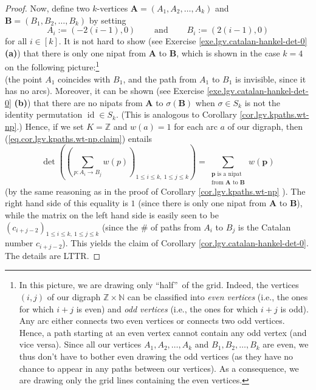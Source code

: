 \begin{proof}
Now, define two $k$-vertices $\mathbf{A}=\left(  A_{1},A_{2},\ldots
,A_{k}\right)  $ and $\mathbf{B}=\left(  B_{1},B_{2},\ldots,B_{k}\right)  $ by
setting%
\[
A_{i}:=\left(  -2\left(  i-1\right)  ,0\right)  \ \ \ \ \ \ \ \ \ \ \text{and}%
\ \ \ \ \ \ \ \ \ \ B_{i}:=\left(  2\left(  i-1\right)  ,0\right)
\]
for all $i\in\left[  k\right]  $. It is not hard to show (see Exercise
\ref{exe.lgv.catalan-hankel-det-0} \textbf{(a)}) that there is only one nipat
from $\mathbf{A}$ to $\mathbf{B}$, which is shown in the case $k=4$ on the
following picture:\footnote{In this picture, we are drawing only
\textquotedblleft half\textquotedblright\ of the grid. Indeed, the vertices
$\left(  i,j\right)  $ of our digraph $\mathbb{Z}\times\mathbb{N}$ can be
classified into \emph{even vertices} (i.e., the ones for which $i+j$ is even)
and \emph{odd vertices} (i.e., the ones for which $i+j$ is odd). Any arc
either connects two even vertices or connects two odd vertices. Hence, a path
starting at an even vertex cannot contain any odd vertex (and vice versa).
Since all our vertices $A_{1},A_{2},\ldots,A_{k}$ and $B_{1},B_{2}%
,\ldots,B_{k}$ are even, we thus don't have to bother even drawing the odd
vertices (as they have no chance to appear in any paths between our vertices).
As a consequence, we are drawing only the grid lines containing the even
vertices.}%
\[%
\]
(the point $A_{1}$ coincides with $B_{1}$, and the path from $A_{1}$ to
$B_{1}$ is invisible, since it has no arcs). Moreover, it can be shown (see
Exercise \ref{exe.lgv.catalan-hankel-det-0} \textbf{(b)}) that there are no
nipats from $\mathbf{A}$ to $\sigma\left(  \mathbf{B}\right)  $ when
$\sigma\in S_{k}$ is not the identity permutation $\operatorname*{id}\in
S_{k}$. (This is analogous to Corollary \ref{cor.lgv.kpaths.wt-np}.) Hence, if
we set $K=\mathbb{Z}$ and $w\left(  a\right)  =1$ for each arc $a$ of our
digraph, then (\ref{eq.cor.lgv.kpaths.wt-np.claim}) entails%
\begin{equation}
\det\left(  \left(  \sum_{p:A_{i}\rightarrow B_{j}}w\left(  p\right)  \right)
_{1\leq i\leq k,\ 1\leq j\leq k}\right)  =\sum_{\substack{\mathbf{p}\text{ is
a nipat}\\\text{from }\mathbf{A}\text{ to }\mathbf{B}}}w\left(  \mathbf{p}%
\right) \nonumber
\end{equation}
(by the same reasoning as in the proof of Corollary \ref{cor.lgv.kpaths.wt-np}%
). The right hand side of this equality is $1$ (since there is only one nipat
from $\mathbf{A}$ to $\mathbf{B}$), while the matrix on the left hand side is
easily seen to be $\left(  c_{i+j-2}\right)  _{1\leq i\leq k,\ 1\leq j\leq k}$
(since the \# of paths from $A_{i}$ to $B_{j}$ is the Catalan number
$c_{i+j-2}$). This yields the claim of Corollary
\ref{cor.lgv.catalan-hankel-det-0}. The details are LTTR.
\end{proof}

